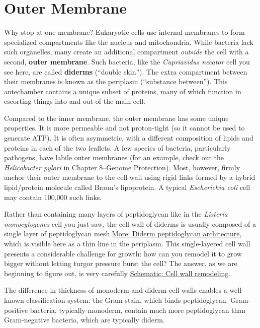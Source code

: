 \documentclass[]{tufte-book}
\begin{document}
\hypertarget{outer-membrane}{%
\section{Outer Membrane}\label{outer-membrane}}

Why stop at one membrane? Eukaryotic cells use internal membranes to form specialized compartments like the nucleus and mitochondria. While bacteria lack such organelles, many create an additional compartment \emph{outside} the cell with a second, \textbf{outer membrane}. Such bacteria, like the \emph{Cupriavidus necator} cell you see here, are called \textbf{diderms} (``double skin''). The extra compartment between their membranes is known as the periplasm (``substance between''). This antechamber contains a unique subset of proteins, many of which function in escorting things into and out of the main cell.

Compared to the inner membrane, the outer membrane has some unique properties. It is more permeable and not proton-tight (so it cannot be used to generate ATP). It is often asymmetric, with a different composition of lipids and proteins in each of the two leaflets. A few species of bacteria, particularly pathogens, have labile outer membranes (for an example, check out the \emph{Helicobacter pylori} in Chapter 8--Genome Protection). Most, however, firmly anchor their outer membrane to the cell wall using rigid links formed by a hybrid lipid/protein molecule called Braun's lipoprotein. A typical \emph{Escherichia coli} cell may contain 100,000 such links.

Rather than containing many layers of peptidoglycan like in the \emph{Listeria monocytogenes} cell you just saw, the cell wall of diderms is usually composed of a single layer of peptidoglycan mesh \protect\hyperlink{Diderm_peptidoglycan_architecture}{More: Diderm peptidoglycan architecture}, which is visible here as a thin line in the periplasm. This single-layered cell wall presents a considerable challenge for growth: how can you remodel it to grow bigger without letting turgor pressure burst the cell? The answer, as we are beginning to figure out, is very carefully \protect\hyperlink{Cell_wall_remodeling}{Schematic: Cell wall remodeling}.

The difference in thickness of monoderm and diderm cell walls enables a well-known classification system: the Gram stain, which binds peptidoglycan. Gram-positive bacteria, typically monoderm, contain much more peptidoglycan than Gram-negative bacteria, which are typically diderm.
\end{document}
